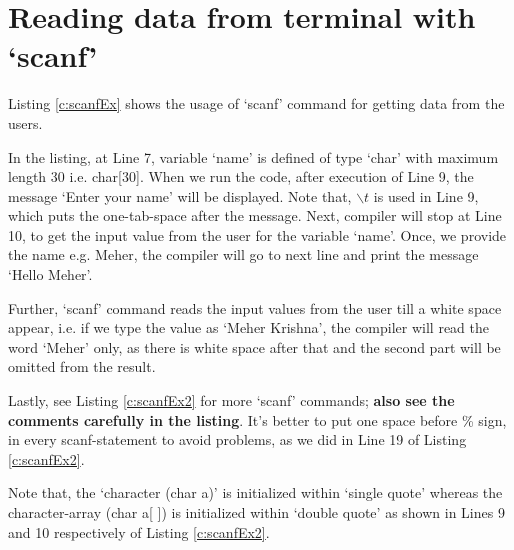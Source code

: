\section{Reading data from terminal with `scanf'}

Listing \ref{c:scanfEx} shows the usage of `scanf' command for getting data from the users. 


\begin{explanation}
In the listing, at Line 7, variable `name' is defined of type `char' with maximum length 30 i.e. char[30]. When we run the code, after execution of Line 9, the message `Enter your name' will be displayed. Note that, $\backslash t$ is used in Line 9, which puts the one-tab-space after the message. Next, compiler will stop at Line 10, to get the input value from the user for the variable `name'. Once, we provide the name e.g. Meher, the compiler will go to next line and print the message `Hello Meher'. 

Further, `scanf' command reads the input values from the user till a white space appear, i.e. if we type the value as `Meher Krishna', the compiler will read the word `Meher' only, as there is white space after that and the second part will be omitted from the result.  
\end{explanation}

\begin{noNumBox}
	Lastly, see Listing \ref{c:scanfEx2} for more `scanf' commands; \textbf{also see the comments carefully in the listing}. It's better to put one space before \% sign, in every scanf-statement to avoid problems, as we did in Line 19 of Listing \ref{c:scanfEx2}.
\end{noNumBox}





\begin{noNumBox}
Note that, the `character (char a)' is initialized within `single quote' whereas the character-array (char a[ ]) is initialized within `double quote' as shown in Lines 9 and 10 respectively of Listing \ref{c:scanfEx2}. 
\end{noNumBox}

